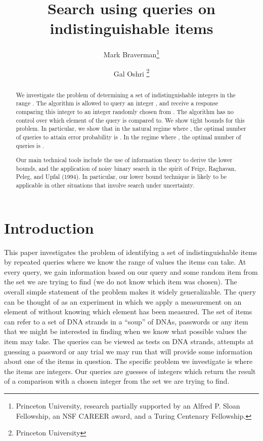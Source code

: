 \documentclass[12pt]{article}
\begin{document}
\title{Search using queries on indistinguishable items}

\author{Mark Braverman\thanks{Princeton University, research partially supported by an Alfred P. Sloan Fellowship, an NSF CAREER award, and a Turing Centenary Fellowship. }\and
Gal Oshri \thanks{Princeton University}}


\maketitle


\begin{abstract}
We investigate the problem of determining a set  of  indistinguishable integers in the range . 
The algorithm is allowed to query an integer , and receive a response comparing this integer to an integer randomly chosen from . 
The algorithm has no control over which element of  the query  is compared to. 
We show tight bounds for this problem. In particular, we show that in the natural regime where , the optimal number of queries to attain  error probability is . 
In the regime where , the optimal number of queries is . 

Our main technical tools include the use of information theory to derive the lower bounds, and the application of noisy binary search 
in the spirit of Feige, Raghavan, Peleg, and Upfal (1994). In particular, our lower bound technique is likely to be applicable in other 
situations that involve search under uncertainty. 
\end{abstract}

\newpage

\setcounter{page}{1}



\section{Introduction}
This paper investigates the problem of identifying a set  of indistinguishable items by repeated queries where we know the range of values the items can take. At every query, we gain information based on our query and some random item from the set  we are trying to find (we do not know which item was chosen). The overall simple statement of the problem makes it widely generalizable. The query can be thought of as an experiment in which we apply a measurement on an element of  without knowing which element has been measured. The set of items can refer to a set of DNA strands in a ``soup'' of DNAs, passwords or any item that we might be interested in finding when we know what possible values the item may take. The queries can be viewed as tests on DNA strands, attempts at guessing a password or any trial we may run that will provide some information about one of the items in question. The specific problem we investigate is where the items are integers. Our queries are guesses of integers which return the result of a comparison with a chosen integer from the set we are trying to find.
\end{document}
